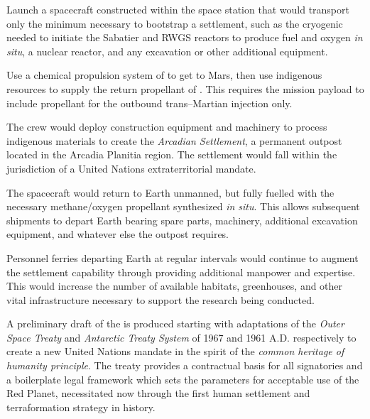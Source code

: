 \item Launch a spacecraft constructed within the space station that would transport only the minimum necessary to bootstrap a settlement, such as the cryogenic  needed to initiate the Sabatier and RWGS reactors to produce fuel and oxygen {\it in situ}, a nuclear reactor, and any excavation or other additional equipment.

\item Use a chemical propulsion system of  to get to Mars, then use indigenous resources to supply the return propellant of . This requires the mission payload to include propellant for the outbound trans--Martian injection only.

\item The crew would deploy construction equipment and machinery to process indigenous materials to create the {\it Arcadian Settlement}, a permanent outpost located in the Arcadia Planitia region. The settlement would fall within the jurisdiction of a United Nations extraterritorial mandate.

\item The spacecraft would return to Earth unmanned, but fully fuelled with the necessary methane/oxygen propellant synthesized {\it in situ}. This allows subsequent shipments to depart Earth bearing spare parts, machinery, additional excavation equipment, and whatever else the outpost requires.

\item Personnel ferries departing Earth at regular intervals would continue to augment the settlement capability through providing additional manpower and expertise. This would increase the number of available habitats, greenhouses, and other vital infrastructure necessary to support the research being conducted.
\stopitemize

A preliminary draft of the  is produced starting with adaptations of the {\it Outer Space Treaty} and {\it Antarctic Treaty System} of 1967 and 1961 A.D. respectively to create a new United Nations mandate in the spirit of the {\it common heritage of humanity principle}. The treaty provides a contractual basis for all signatories and a boilerplate legal framework which sets the parameters for acceptable use of the Red Planet, necessitated now through the first human settlement and terraformation strategy in history. 

